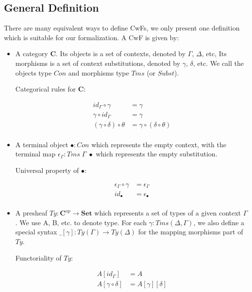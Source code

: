 \subsection{General Definition}

There are many equivalent ways to define CwFs, we only present one definition which is suitable for our formalization. A CwF is given by:

\begin{itemize}
  \item{A category \textbf{C}. Its objects is a set of contexts, denoted by $\Gamma$, $\Delta$, etc, Its morphisms is a set of context substitutions, denoted by $\gamma$, $\delta$, etc. We call the objects type $Con$ and morphisms type $Tms$ (or $Subst$).
  
  Categorical rules for \textbf{C}:

  \begin{align*}
    id_{\Gamma} \circ \gamma & = \gamma \\
    \gamma \circ id_{\Gamma} & = \gamma \\
    (\gamma \circ \delta) \circ \theta & = \gamma \circ (\delta \circ \theta) \\
  \end{align*}
  }

  \item{A terminal object $\bullet : Con$ which represents the empty context, with the terminal map $\epsilon_{\Gamma} : Tms\;\Gamma\;\bullet$ which represents the empty substitution. 
  
  Universal property of $\bullet$:

  \begin{align*}
    \epsilon_{\Gamma} \circ \gamma & = \epsilon_{\Gamma} \\
    id_{\bullet} & = \epsilon_{\bullet} \\
  \end{align*}
  }

  \item{A presheaf $Ty : \textbf{C}^{op} \to \textbf{Set}$ which represents a set of types of a given context $\Gamma$. We use A, B, etc. to denote type. For each $\gamma : Tms (\Delta, \Gamma)$, we also define a special syntax $\_[\gamma] : Ty(\Gamma) \to Ty(\Delta)$ for the mapping morphisms part of $Ty$.

  Functoriality of $Ty$:

  \begin{align*}
    A [id_{\Gamma}] & = A \\
    A [\gamma \circ \delta] & = A [\gamma] [\delta] \\
  \end{align*}
  }


\end{itemize}
